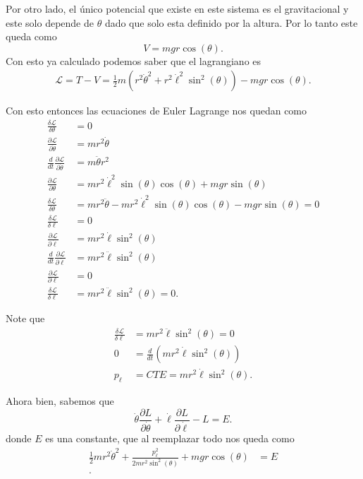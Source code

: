 \documentclass{report}
\begin{document}
Por otro lado, el único potencial que existe en este sistema es el gravitacional  y este solo depende de $\theta$ dado que solo esta definido por la altura. Por lo tanto este queda como \[
V = mg r\cos\left( \theta \right) 
.\] Con esto ya calculado podemos saber que el lagrangiano es
\begin{align*}
  \mathcal{L} = T - V = \frac{1}{2}m\left( r^2\dot{\theta}^2 + r^2\dot{\ell}^2\sin^2\left( \theta \right)  \right) - mgr\cos\left( \theta \right) 
.\end{align*}

Con esto entonces las ecuaciones de Euler Lagrange nos quedan como
\begin{align*}
  \frac{\delta \mathcal{L}}{\delta \theta} &= 0 \\
  \frac{\partial \mathcal{L}}{\partial \dot{\theta}} &= mr^2\dot{\theta} \\
  \frac{d}{dt}\frac{\partial \mathcal{L}}{\partial \dot{\theta}} &= m\ddot{\theta}r^2 \\
  \frac{\partial \mathcal{L}}{\partial \theta} &= mr^2\dot{\ell}^2\sin\left( \theta \right) \cos\left( \theta \right) + mgr\sin\left( \theta \right)  \\
  \frac{\delta \mathcal{L}}{\delta \theta} &= mr^2\ddot{\theta} -mr^2\dot{\ell}^2\sin\left( \theta \right) \cos\left( \theta \right) - mgr\sin\left( \theta \right) = 0 \\
  \frac{\delta \mathcal{L}}{\delta \ell} &= 0 \\
  \frac{\partial \mathcal{L}}{\partial \dot{\ell}} &= mr^2\dot{\ell}\sin^2\left( \theta \right)  \\
  \frac{d}{dt}\frac{\partial \mathcal{L}}{\partial \dot{\ell}} &= mr^2\ddot{\ell}\sin^2\left( \theta \right) \\
  \frac{\partial \mathcal{L}}{\partial \ell} &= 0\\
  \frac{\delta \mathcal{L}}{\delta \ell} &= mr^2\ddot{\ell}\sin^2\left( \theta \right) = 0
.\end{align*}

Note que
\begin{align*}
  \frac{\delta \mathcal{L}}{\delta \ell} &= mr^2\ddot{\ell}\sin^2\left( \theta \right) = 0\\
  0 &= \frac{d}{dt}\left( mr^2\dot{\ell}\sin^2\left( \theta \right) \right)  \\
  p_\ell &= CTE =  mr^2\dot{\ell}\sin^2\left( \theta \right)
.\end{align*}

Ahora bien, sabemos que \[
  \dot{\theta} \frac{\partial L}{\partial \dot{\theta}} + \dot{\ell}\frac{\partial L}{\partial \dot{\ell}} - L = E
.\] donde $E$ es una constante, que al reemplazar todo nos queda como
\begin{align*}
  \frac{1}{2}mr^2\dot{\theta}^2 + \frac{p_\ell^{2}}{2mr^2\sin^2\left( \theta \right) } + mgr\cos\left( \theta \right) &= E \\
.\end{align*}
\end{document}
